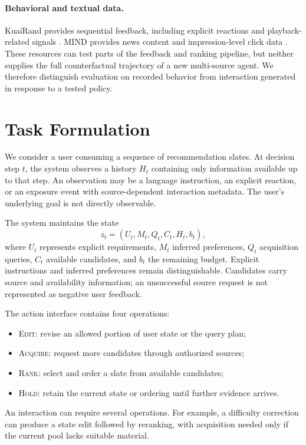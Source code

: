 \documentclass[11pt]{article}
\begin{document}
\paragraph{Behavioral and textual data.}
KuaiRand provides sequential feedback, including explicit reactions and playback-related signals \citep{gao2022kuairand}. MIND provides news content and impression-level click data \citep{wu2020mind}. These resources can test parts of the feedback and ranking pipeline, but neither supplies the full counterfactual trajectory of a new multi-source agent. We therefore distinguish evaluation on recorded behavior from interaction generated in response to a tested policy.

\section{Task Formulation}
\label{sec:task}

We consider a user consuming a sequence of recommendation slates. At decision step $t$, the system observes a history $H_t$ containing only information available up to that step. An observation may be a language instruction, an explicit reaction, or an exposure event with source-dependent interaction metadata. The user's underlying goal is not directly observable.

The system maintains the state
\begin{equation}
z_t = (U_t,M_t,Q_t,C_t,H_t,b_t),
\end{equation}
where $U_t$ represents explicit requirements, $M_t$ inferred preferences, $Q_t$ acquisition queries, $C_t$ available candidates, and $b_t$ the remaining budget. Explicit instructions and inferred preferences remain distinguishable. Candidates carry source and availability information; an unsuccessful source request is not represented as negative user feedback.

The action interface contains four operations:\par\nopagebreak
\begin{itemize}
    \item \textsc{Edit}: revise an allowed portion of user state or the query plan;
    \item \textsc{Acquire}: request more candidates through authorized sources;
    \item \textsc{Rank}: select and order a slate from available candidates;
    \item \textsc{Hold}: retain the current state or ordering until further evidence arrives.
\end{itemize}
An interaction can require several operations. For example, a difficulty correction can produce a state edit followed by reranking, with acquisition needed only if the current pool lacks suitable material.
\end{document}
